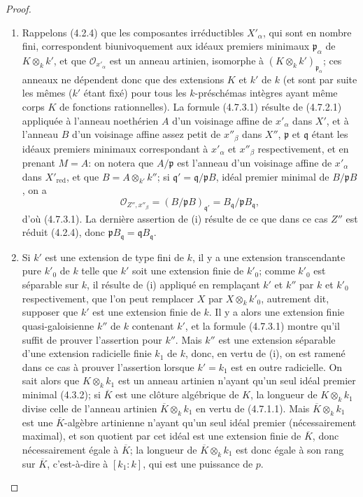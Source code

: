 \begin{proof}
\begin{enumerate}
\item[(i)] Rappelons (4.2.4) que les composantes irréductibles $X'_\alpha$,
qui sont en nombre fini, correspondent biunivoquement aux idéaux premiers
minimaux $\mathfrak p_\alpha$ de $K\otimes_k k'$, et que
$\mathcal O_{x'_\alpha}$ est un anneau artinien, isomorphe à
$(K\otimes_k k')_{\mathfrak p_\alpha}$; ces anneaux ne dépendent donc que des
extensions $K$ et $k'$ de $k$ (et sont par suite les mêmes ($k'$ étant fixé)
pour tous les $k$-préschémas intègres ayant même corps $K$ de fonctions
rationnelles). La formule (4.7.3.1) résulte de (4.7.2.1) appliquée à l'anneau
noethérien $A$ d'un voisinage affine de $x'_\alpha$ dans $X'$, et à l'anneau
$B$ d'un voisinage affine assez petit de $x''_\beta$ dans $X''$, $\mathfrak p$
et $\mathfrak q$ étant les idéaux premiers minimaux correspondant à
$x'_\alpha$ et $x''_\beta$ respectivement, et en prenant $M=A$: on notera que
$A/\mathfrak p$ est l'anneau d'un voisinage affine de $x'_\alpha$ dans
$X'_{\mathrm{red}}$, et que $B=A\otimes_{k'}k''$; si
$\mathfrak q'=\mathfrak q/\mathfrak pB$, idéal premier minimal de
$B/\mathfrak pB$, on a
\[
\mathcal O_{Z'',x''_\beta}
=(B/\mathfrak pB)_{\mathfrak q'}
=B_{\mathfrak q}/\mathfrak pB_{\mathfrak q},
\]
d'où (4.7.3.1). La dernière assertion de (i) résulte de ce que dans ce cas
$Z''$ est réduit (4.2.4), donc
$\mathfrak pB_{\mathfrak q}=\mathfrak qB_{\mathfrak q}$.

\item[(ii)] Si $k'$ est une extension de type fini de $k$, il y a une
extension transcendante pure $k'_0$ de $k$ telle que $k'$ soit une extension
finie de $k'_0$; comme $k'_0$ est séparable sur $k$, il résulte de (i)
appliqué en remplaçant $k'$ et $k''$ par $k$ et $k'_0$ respectivement, que
l'on peut remplacer $X$ par $X\otimes_k k'_0$, autrement dit, supposer que
$k'$ est une extension finie de $k$. Il y a alors une extension finie
quasi-galoisienne $k''$ de $k$ contenant $k'$, et la formule (4.7.3.1) montre
qu'il suffit de prouver l'assertion pour $k''$. Mais $k''$ est une extension
séparable d'une extension radicielle finie $k_1$ de $k$, donc, en vertu de
(i), on est ramené dans ce cas à prouver l'assertion lorsque $k'=k_1$ est en
outre radicielle. On sait alors que $K\otimes_k k_1$ est un anneau artinien
n'ayant qu'un seul idéal premier minimal (4.3.2); si $\overline K$ est une
clôture algébrique de $K$, la longueur de $K\otimes_k k_1$ divise celle de
l'anneau artinien $\overline K\otimes_k k_1$ en vertu de (4.7.1.1). Mais
$\overline K\otimes_k k_1$ est une $\overline K$-algèbre artinienne n'ayant
qu'un seul idéal premier (nécessairement maximal), et son quotient par cet
idéal est une extension finie de $\overline K$, donc nécessairement égale à
$\overline K$; la longueur de $\overline K\otimes_k k_1$ est donc égale à son
rang sur $\overline K$, c'est-à-dire à $[k_1:k]$, qui est une puissance de
$p$.


\end{enumerate}
\end{proof}
